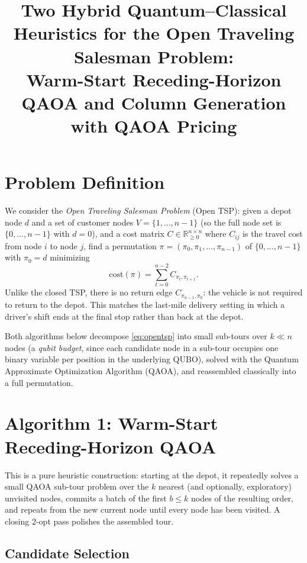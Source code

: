\documentclass[11pt]{article}
\title{Two Hybrid Quantum--Classical Heuristics for the Open Traveling Salesman Problem:\\
Warm-Start Receding-Horizon QAOA and Column Generation with QAOA Pricing}
\author{}
\date{}
\newcommand{\Real}{\mathbb{R}}
\begin{document}
\maketitle

\section{Problem Definition}
\label{sec:problem}

We consider the \emph{Open Traveling Salesman Problem} (Open TSP): given a depot node $d$ and a set of customer nodes $V = \{1, \dots, n-1\}$ (so the full node set is $\{0,\dots,n-1\}$ with $d=0$), and a cost matrix $C \in \Real^{n\times n}_{\ge 0}$ where $C_{ij}$ is the travel cost from node $i$ to node $j$, find a permutation $\pi = (\pi_0, \pi_1, \dots, \pi_{n-1})$ of $\{0,\dots,n-1\}$ with $\pi_0 = d$ minimizing
\begin{equation}
  \mathrm{cost}(\pi) = \sum_{t=0}^{n-2} C_{\pi_t, \pi_{t+1}}.
  \label{eq:opentsp}
\end{equation}
Unlike the closed TSP, there is no return edge $C_{\pi_{n-1}, \pi_0}$: the vehicle is not required to return to the depot. This matches the last-mile delivery setting in which a driver's shift ends at the final stop rather than back at the depot.

Both algorithms below decompose \eqref{eq:opentsp} into small sub-tours over $k \ll n$ nodes (a \emph{qubit budget}, since each candidate node in a sub-tour occupies one binary variable per position in the underlying QUBO), solved with the Quantum Approximate Optimization Algorithm (QAOA), and reassembled classically into a full permutation.

\section{Algorithm 1: Warm-Start Receding-Horizon QAOA}
\label{sec:hybrid}

This is a pure heuristic construction: starting at the depot, it repeatedly solves a small QAOA sub-tour problem over the $k$ nearest (and optionally, exploratory) unvisited nodes, commits a batch of the first $b \le k$ nodes of the resulting order, and repeats from the new current node until every node has been visited. A closing 2-opt pass polishes the assembled tour.

\subsection{Candidate Selection}
\label{sec:hybrid-candidates}
\end{document}
